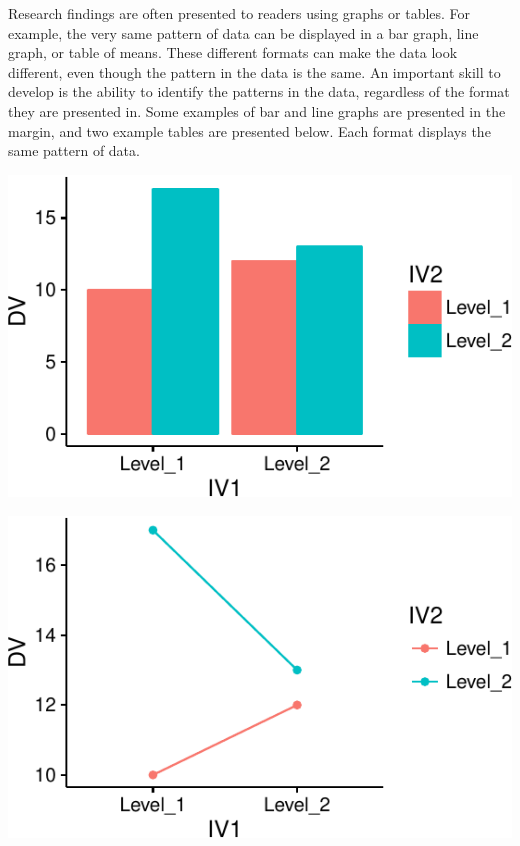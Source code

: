 Research findings are often presented to readers using graphs or tables.
For example, the very same pattern of data can be displayed in a bar
graph, line graph, or table of means. These different formats can make
the data look different, even though the pattern in the data is the
same. An important skill to develop is the ability to identify the
patterns in the data, regardless of the format they are presented in.
Some examples of bar and line graphs are presented in the margin, and
two example tables are presented below. Each format displays the same
pattern of data.

\begin{marginfigure}
\includegraphics{Factorial_files/figure-latex/unnamed-chunk-11-1} \end{marginfigure}
\begin{marginfigure}
\includegraphics{Factorial_files/figure-latex/unnamed-chunk-11-2} \end{marginfigure}

